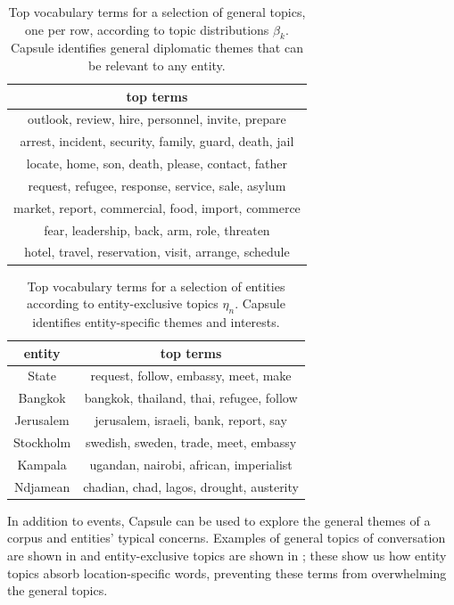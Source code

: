 \begin{table}
\centering
\small
\begin{tabular}{c}
\toprule
top terms \\
\midrule
outlook, review, hire, personnel, invite, prepare \\
arrest, incident, security, family, guard, death, jail \\
locate, home, son, death, please, contact, father \\
request, refugee, response, service, sale, asylum \\
market, report, commercial, food, import, commerce \\
fear, leadership, back, arm, role, threaten \\
hotel, travel, reservation, visit, arrange, schedule \\
\bottomrule
\end{tabular}
\label{tab:topics}
\caption{Top vocabulary terms for a selection of general topics, one per row, according to topic distributions $\beta_k$.  Capsule identifies general diplomatic themes that can be relevant to any entity.}
\end{table}

\begin{table}
\centering
\small
\begin{tabular}{cc}
\toprule
entity & top terms \\
\midrule
State & request, follow, embassy, meet, make \\
Bangkok & bangkok, thailand, thai, refugee, follow \\
Jerusalem & jerusalem, israeli, bank, report, say \\
Stockholm & swedish, sweden, trade, meet, embassy \\
Kampala & ugandan, nairobi, african, imperialist \\
Ndjamean & chadian, chad, lagos, drought, austerity \\
\bottomrule
\end{tabular}
\label{tab:entities}
\caption{Top vocabulary terms for a selection of entities according to entity-exclusive topics $\eta_n$.  Capsule identifies entity-specific themes and interests. }
\end{table}

In addition to events, Capsule can be used to explore the general themes of a corpus and entities' typical concerns.  Examples of general topics of conversation are shown in  and entity-exclusive topics are shown in ; these show us how entity topics absorb location-specific words, preventing these terms from overwhelming the general topics.

